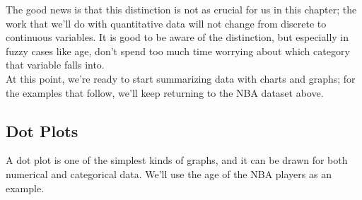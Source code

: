 The good news is that this distinction is not as crucial for us in this chapter; the work that we'll do with quantitative data will not change from discrete to continuous variables.  It is good to be aware of the distinction, but especially in fuzzy cases like age, don't spend too much time worrying about which category that variable falls into.\\

At this point, we're ready to start summarizing data with charts and graphs; for the examples that follow, we'll keep returning to the NBA dataset above.

\subsection{Dot Plots}
A dot plot is one of the simplest kinds of graphs, and it can be drawn for both numerical and categorical data.  We'll use the age of the NBA players as an example.


